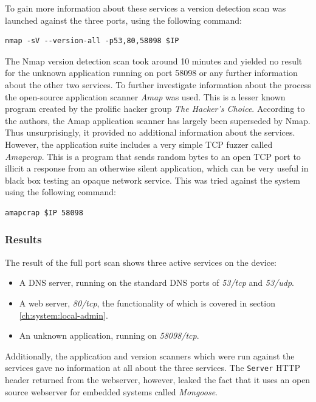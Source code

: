 To gain more information about these services a version detection scan was launched against the three ports, using the following command:
\begin{lstlisting}[frame=tb]
    nmap -sV --version-all -p53,80,58098 $IP
\end{lstlisting}
The Nmap version detection scan took around 10 minutes and yielded no result for the unknown application running on port 58098 or any further information about the other two services. To further investigate information about the process the open-source application scanner \textit{Amap} was used. This is a lesser known program created by the prolific hacker group \textit{The Hacker's Choice}. According to the authors, the Amap application scanner has largely been superseded by Nmap. Thus unsurprisingly, it provided no additional information about the services. However, the application suite includes a very simple TCP fuzzer called \textit{Amapcrap}. This is a program that sends random bytes to an open TCP port to illicit a response from an otherwise silent application, which can be very useful in black box testing an opaque network service. This was tried against the system using the following command:
\begin{lstlisting}[frame=tb]
    amapcrap $IP 58098
\end{lstlisting}

\subsubsection{Results}
The result of the full port scan shows three active services on the device:
\begin{itemize}
    \item A DNS server, running on the standard DNS ports of \textit{53/tcp} and \textit{53/udp}.
    \item A web server, \textit{80/tcp}, the functionality of which is covered in section \ref{ch:system:local-admin}.
    \item An unknown application, running on \textit{58098/tcp}.
\end{itemize}
Additionally, the application and version scanners which were run against the services gave no information at all about the three services. The \texttt{Server} HTTP header returned from the webserver, however, leaked the fact that it uses an open source webserver for embedded systems called \textit{Mongoose}.

